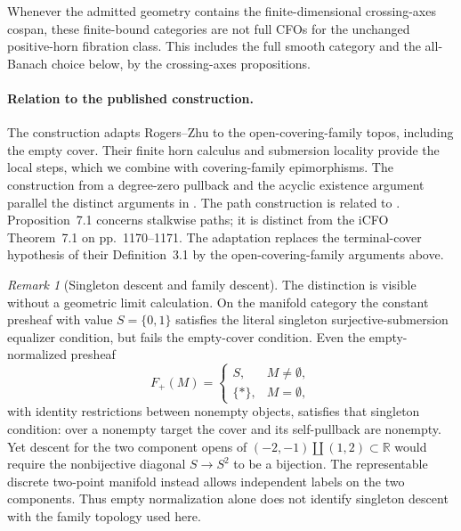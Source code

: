 \documentclass[12pt]{amsart}
\theoremstyle{definition}
\theoremstyle{remark}
\newtheorem{rem}[thm]{Remark}
\numberwithin{equation}{section}
\newcommand{\R}{\mathbb R}
\begin{document}
Whenever the admitted geometry contains the finite-dimensional
crossing-axes cospan, these finite-bound categories are not
full CFOs for the unchanged positive-horn fibration class.
This includes the full smooth category and the all-Banach
choice below, by the crossing-axes propositions.

\paragraph{Relation to the published construction.}
The construction adapts Rogers--Zhu to the
open-covering-family topos, including the empty cover.
Their finite horn calculus
\cite[Lemmas~3.6--3.7, Remark~3.8 and Lemma~3.9,
pp.~1149--1150]{RogersZhu2020}
and submersion locality
\cite[Propositions~6.7 and~6.12, pp.~1161--1166]{RogersZhu2020}
provide the local steps, which we combine with
covering-family epimorphisms. The construction from a
degree-zero pullback and the acyclic existence argument
parallel the distinct arguments in
\cite[Propositions~7.10 and~7.12,
pp.~1173--1176]{RogersZhu2020}.
The path construction is related to
\cite[Proposition~7.1, p.~1167; Proposition~7.2,
pp.~1168--1169; Proposition~7.13 and Lemma~7.14,
pp.~1176--1178; Appendix~A, pp.~1209--1212]{RogersZhu2020}.
Proposition~7.1 concerns stalkwise paths; it is distinct
from the iCFO Theorem~7.1 on pp.~1170--1171.
The adaptation replaces the terminal-cover hypothesis
of their Definition~3.1 by the open-covering-family
arguments above.

\begin{rem}[Singleton descent and family descent]
\label{rem:ordinary-family-topology}
The distinction is visible without a geometric limit
calculation. On the manifold category the constant
presheaf with value $S=\{0,1\}$ satisfies the literal
singleton surjective-submersion equalizer condition,
but fails the empty-cover condition. Even the
empty-normalized presheaf
\[
 F_+(M)=
 \begin{cases}
 S,&M\ne\emptyset,\\
 \{*\},&M=\emptyset,
 \end{cases}
\]
with identity restrictions between nonempty objects,
satisfies that singleton condition: over a nonempty
target the cover and its self-pullback are nonempty.
Yet descent for the two component opens of
$(-2,-1)\amalg(1,2)\subset\R$ would require the
nonbijective diagonal $S\to S^2$ to be a bijection.
The representable discrete two-point manifold instead
allows independent labels on the two components.
Thus empty normalization alone does not identify
singleton descent with the family topology used here.
\end{rem}
\end{document}
